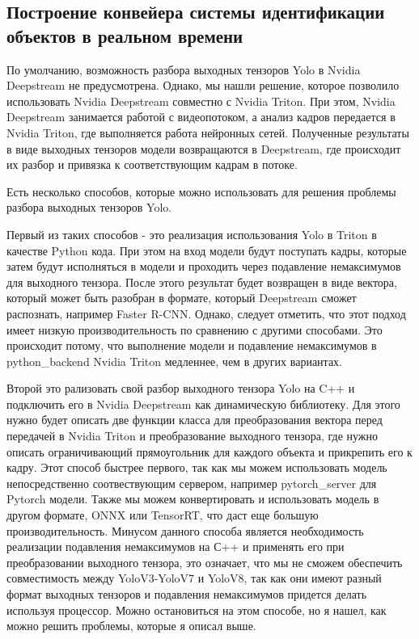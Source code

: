 \subsection{Построение конвейера системы идентификации объектов в реальном времени}
По умолчанию, возможность разбора выходных тензоров Yolo в Nvidia Deepstream не предусмотрена. Однако, мы нашли решение, которое позволило использовать Nvidia Deepstream совместно с Nvidia Triton. При этом, Nvidia Deepstream занимается работой с видеопотоком, а анализ кадров передается в Nvidia Triton, где выполняется работа нейронных сетей. Полученные результаты в виде выходных тензоров модели возвращаются в Deepstream, где происходит их разбор и привязка к соответствующим кадрам в потоке.

Есть несколько способов, которые можно использовать для решения проблемы разбора выходных тензоров Yolo. 

Первый из таких способов - это реализация использования Yolo в Triton в качестве Python кода. При этом на вход модели будут поступать кадры, которые затем будут исполняться в модели и проходить через подавление немаксимумов для выходного тензора. После этого результат будет возвращен в виде вектора, который может быть разобран в формате, который Deepstream сможет распознать, например Faster R-CNN. Однако, следует отметить, что этот подход имеет низкую производительность по сравнению с другими способами. Это происходит потому, что выполнение модели и подавление немаксимумов в python\_backend Nvidia Triton медленнее, чем в других вариантах. 

Второй это рализовать свой разбор выходного тензора Yolo на C++ и подключить его в Nvidia Deepstream как динамическую библиотеку. Для этого нужно будет описать две функции класса для преобразования вектора перед передачей в Nvidia Triton и преобразование выходного тензора, где нужно описать ограничивающий прямоугольник для каждого объекта и прикрепить его к кадру. Этот способ быстрее первого, так как мы можем использовать модель непосредственно соотвествующим сервером, например pytorch\_server для Pytorch модели. Также мы можем конвертировать и использовать модель в другом формате, ONNX или TensorRT, что даст еще большую производительность. Минусом данного способа является необходимость реализации подавления немаксимумов на С++ и применять его при преобразовании выходного тензора, это означает, что мы не сможем обеспечить совместимость между YoloV3-YoloV7 и YoloV8, так как они имеют разный формат выходных тензоров и  подавления немаксимумов придется делать используя процессор. Можно остановиться на этом способе, но я нашел, как можно решить проблемы, которые я описал выше.

